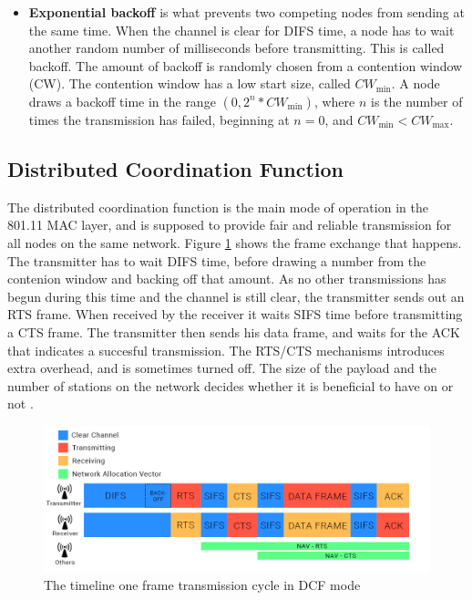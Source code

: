 {\begin{itemize}
\begin{itemize}
	\end{itemize}
	\item \textbf{Exponential backoff} is what prevents two competing nodes from sending at the same time. When the channel is clear
	for DIFS time, a node has to wait another  random number of milliseconds before transmitting. This is called backoff.
	The amount of backoff is randomly chosen from a contention window (CW). The contention window has a low start size,
	called $CW_{\text{min}}$. A node draws a backoff time in the range $(0, 2^n*CW_{\text{min}})$, where $n$ is the number 
	of times the transmission has failed, beginning at $n=0$, and $CW_{\text{min}}<CW_{\text{max}}$.
	\end{itemize}

	\subsection{Distributed Coordination Function}
	The distributed coordination function is the main mode of operation in the 801.11 MAC layer, and is supposed to provide fair and reliable 
	transmission for all nodes on the same network. Figure \ref{fig:dcfmode} shows the 
	frame exchange that happens. The transmitter has to wait DIFS time, before drawing 
	a number from the contenion window and backing off that amount.
	As no other transmissions has begun during this time and the channel is
	still clear, the transmitter sends out an RTS frame. When received by the receiver
	it waits SIFS time before transmitting a CTS frame. The transmitter then sends his
	data frame, and waits for the ACK that indicates a succesful transmission. The 
	RTS/CTS mechanisms introduces extra overhead, and is sometimes turned off. The
	size of the payload and the number of stations on the network decides
	whether it is beneficial to have on or not \cite{DCFanalysis}.



	\begin{figure}
	\center
	\includegraphics[scale=0.35]{Images/DCF.jpg}
	\caption{The timeline one frame transmission cycle in DCF mode}
	\label{fig:dcfmode}
	\end{figure}



}
